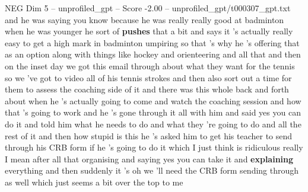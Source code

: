 \begin{textsample}{NEG Dim 5 – unprofiled\_gpt – Score -2.00 – unprofiled\_gpt/t000307\_gpt.txt}  \label{ex:f5_neg_002}
and he was saying you know because he was really really good at badminton when he was younger he sort of \textbf{pushes} that a bit and says it ’s actually really easy to get a high mark in badminton umpiring so that ’s why he ’s offering that as an option along with things like hockey and orienteering and all that and then on the inset day we got this email through about what they want for the tennis so we ’ve got to video all of his tennis strokes and then also sort out a time for them to assess the coaching side of it and there was this whole back and forth about when he ’s actually going to come and watch the coaching session and how that ’s going to work and he ’s gone through it all with him and said yes you can do it and told him what he needs to do and what they ’re going to do and all the rest of it and then how stupid is this he ’s asked him to get his teacher to send through his CRB form if he ’s going to do it which I just think is ridiculous really I mean after all that organising and saying yes you can take it and \textbf{explaining} everything and then suddenly it ’s oh we ’ll need the CRB form sending through as well which just seems a bit over the top to me

\end{textsample}
